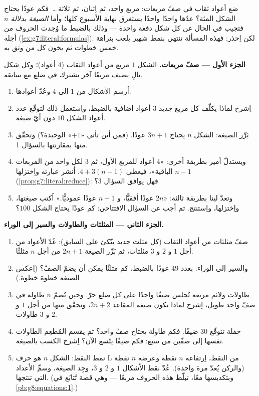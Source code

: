 \begin{problem}
\label{pb:g7:literal:1}
ضع أعواد ثقاب في صفّ مربعات: مربع واحد، ثم اِثنان، ثم
ثلاثة\,\dots\ فكم عودًا يحتاج الشكل المئة؟
عدّها واحدًا واحدًا يستغرق نهاية الأسبوع كلها؛ وأما \emph{الصيغة
بدلالة $n$} فتجيب في الحال عن كل شكل دفعة واحدة --- وذلك
بالضبط ما وُجدت الحروف من أجله
(\cref{ex:g7:literal:formulas}). لكن اِحذر: فهذه المسألة تنتهي
بنمط شهير يلعب بنزاهة خمس خطوات ثم
يخون كل من وثق به.

\medskip
\noindent\textbf{الجزء الأول --- صفّ مربعات.}
الشكل $1$ مربع من أعواد الثقاب ($4$ أعواد)؛ وكل شكل تالٍ
يضيف مربعًا آخر يشترك في ضلع مع سابقه.
\begin{enumerate}
  \item اُرسم الأشكال من $1$ إلى $4$ وعُدّ أعوادها.
  \item اِشرح لماذا يكلّف كل مربع جديد $3$ أعواد إضافية
        بالضبط، واِستعمل ذلك لتوقّع عدد أعواد الشكل
        $10$ دون أيّ صيغة.
  \item بَرِّر الصيغة: الشكل $n$ يحتاج $3n + 1$ عودًا.
        (فمن أين تأتي «$+1$» الوحيدة؟) وتحقّق منها
        بمقارنتها بالسؤال 1.
  \item ويستدلّ أمير بطريقة أخرى: «$4$ أعواد للمربع
        الأول، ثم $3$ لكل واحد من المربعات $n - 1$ الباقية»، فيعطي
        $4 + 3(n - 1)$. اُنشر عبارته واِختزلها
        (\cref{prop:g7:literal:reduce}): فهل يوافق
        السؤال 3؟
  \item وتعدّ لينا بطريقة ثالثة: «$2n$ عودًا أفقيًّا،
        و $n + 1$ عودًا عموديًّا.» اُكتب صيغتها، واِختزلها،
        واِستنتج. ثم أجب عن السؤال الافتتاحي: كم عودًا
        يحتاج الشكل $100$؟
\end{enumerate}

\medskip
\noindent\textbf{الجزء الثاني --- المثلثات والطاولات والسير
إلى الوراء.}
\begin{enumerate}[resume]
  \item صفّ مثلثات من أعواد الثقاب (كل مثلث جديد يتّكئ على
        السابق): عُدّ الأعواد من أجل $1$ و $2$ و $3$
        مثلثات، ثم بَرِّر الصيغة $2n + 1$ من أجل $n$
        مثلثًا.
  \item والسير إلى الوراء: بعدد $49$ عودًا بالضبط، كم
        مثلثًا يمكن أن يضمّ الصفّ؟ (اِعكس الصيغة خطوة
        خطوة.)
  \item طاولات ولائم مربعة تُجلس ضيفًا واحدًا على كل ضلع حرّ. وحين
        تُضمّ $n$ طاولة في صفّ واحد طويل، اِشرح لماذا تكون
        صيغة المقاعد $2n + 2$، وتحقّق منها من أجل $1$ و $2$
        و $3$ طاولات.
  \item حفلة تتوقّع $30$ ضيفًا. فكم طاولة يحتاج صفّ
        واحد؟ ثم يقسم المُطعِم الطاولات نفسها إلى
        صفّين من سبع: فكم ضيفًا يتّسع الآن؟
        اِشرح الكسب بالصيغة.
  \item نمط النقط: الشكل $n$ هو حرف L من النقط، اِرتفاعه $n$
        نقطة وعرضه $n$ نقطة (والركن يُعدّ مرة واحدة). عُدّ
        نقط الأشكال $1$ و $2$ و $3$، وجِد الصيغة، وسمِّ
        الأعداد التي تنتجها. (وبتكديسها معًا، تبلّط هذه الحروف
        مربعًا --- وهي قصة تُتابَع في
        \cref{pb:g8:equations:1}.)
\end{enumerate}


\end{problem}
